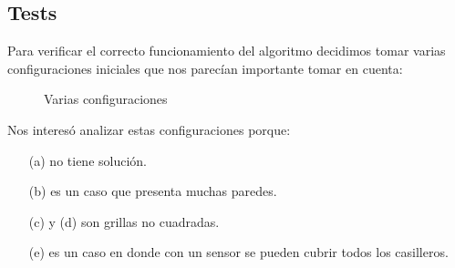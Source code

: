 \subsection{Tests}

Para verificar el correcto funcionamiento del algoritmo decidimos tomar varias configuraciones iniciales que nos parecían importante tomar en cuenta:

\begin{figure}[H]
 \centering
 \caption{Varias configuraciones}
 \label{f:configs}
\end{figure}

Nos interesó analizar estas configuraciones porque:

\begin{itemize}
	\item[(a)] no tiene solución.
	\item[(b)] es un caso que presenta muchas paredes.
	\item[(c) y (d)] son grillas no cuadradas.
	\item[(e)] es un caso en donde con un sensor se pueden cubrir todos los casilleros.
\end{itemize}

